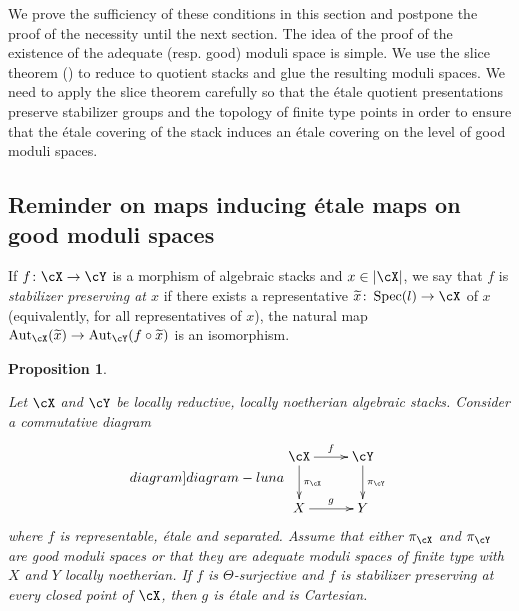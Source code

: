 \documentclass[a4paper]{amsart}
\numberwithin{equation}{section}
\theoremstyle{plain}
\newtheorem{prop}[thm]{Proposition}
\theoremstyle{definition}
\DeclareMathOperator{\Spec}{Spec}
\DeclareMathOperator{\Aut}{Aut}
\newcommand{\co}{\colon}
\begin{document}
We prove the sufficiency of these conditions in this section and postpone the proof of the necessity until the next section.
The idea of the proof of the existence of the adequate (resp. good) moduli space is simple. We use the slice theorem () to reduce to quotient stacks and glue the resulting moduli spaces. We need to apply the slice theorem carefully so that the \'etale quotient presentations preserve stabilizer groups and the topology of finite type points in order to ensure that the \'{e}tale covering of the stack induces an \'etale covering on the level of good moduli spaces.
  
\subsection{Reminder on maps inducing \'etale maps on good moduli spaces}
 
 If $f \co \cX \to \cY$ is a morphism of algebraic stacks and $x \in |\cX|$, we say that $f$ is \emph{stabilizer preserving at $x$} if there exists a representative $\widetilde{x} \co \Spec(l) \to \cX$ of $x$ (equivalently, for all representatives of $x$), the natural map $\Aut_{\cX}(\widetilde{x}) \to \Aut_{\cY}(f \circ \widetilde{x})$ is an isomorphism.
 
 \begin{prop}  \label{P:etale-preserving}

Let $\cX$ and $\cY$ be locally reductive, locally noetherian algebraic stacks.
Consider a commutative diagram 
\begin{equation} \label[diagram]{diagram-luna}
\begin{split}
\xymatrix{ 
\cX \ar[r]^f \ar[d]^{\pi_{\cX}}		& \cY \ar[d]^{\pi_{\cY}} \\
X \ar[r]^g					& Y
}
\end{split}
\end{equation}
where $f$ is representable, \'etale and separated. Assume that either $\pi_{\cX}$ and $\pi_{\cY}$ are good moduli spaces or that they are adequate moduli spaces of finite type with $X$ and $Y$ locally noetherian.
If $f$ is $\Theta$-surjective and $f$ is stabilizer preserving at every closed point of $\cX$, then $g$ is \'etale and   is Cartesian.
\end{prop}
 
\end{document}
